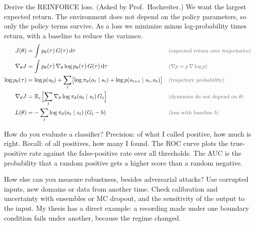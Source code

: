\begin{qabox}{Derive the REINFORCE loss. (Asked by Prof.\ Hochreiter.)}
\explain We want the largest expected return. The environment does not depend on the policy
parameters, so only the policy terms survive. As a loss we minimize minus log-probability times
return, with a baseline to reduce the variance.
\derive
\begin{align*}
J(\theta) &= \int p_\theta(\tau)\,G(\tau)\,\mathrm{d}\tau \why{expected return over trajectories} \\
\nabla_\theta J &= \int p_\theta(\tau)\,\nabla_\theta\log p_\theta(\tau)\,G(\tau)\,\mathrm{d}\tau \why{$\nabla p = p\,\nabla\log p$} \\
\log p_\theta(\tau) &= \log p(s_0) + \sum_t\bigl[\log\pi_\theta(a_t\mid s_t) + \log p(s_{t+1}\mid s_t,a_t)\bigr] \why{trajectory probability} \\
\nabla_\theta J &= \mathbb{E}_\tau\Bigl[\sum_t\nabla_\theta\log\pi_\theta(a_t\mid s_t)\,G_t\Bigr] \why{dynamics do not depend on $\theta$} \\
L(\theta) &= -\sum_t\log\pi_\theta(a_t\mid s_t)\,(G_t - b) \why{loss with baseline $b$}
\end{align*}
\end{qabox}

\begin{qabox}{How do you evaluate a classifier?}
\explain Precision: of what I called positive, how much is right. Recall: of all positives, how
many I found. The ROC curve plots the true-positive rate against the false-positive rate over all
thresholds. The AUC is the probability that a random positive gets a higher score than a random
negative.
\end{qabox}

\begin{qabox}{How else can you measure robustness, besides adversarial attacks?}
\explain Use corrupted inputs, new domains or data from another time. Check calibration and
uncertainty with ensembles or MC dropout, and the sensitivity of the output to the input. My thesis
has a direct example: a recording made under one boundary condition fails under another, because
the regime changed.
\end{qabox}
